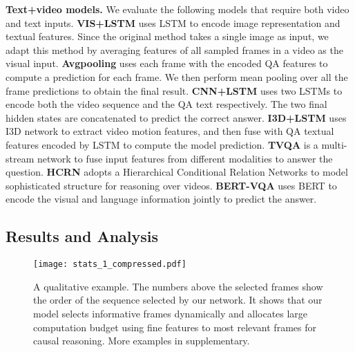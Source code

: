\documentclass[final]{cvpr}
\begin{document}
{\bf Text+video models.} We evaluate the following models that require both video and text inputs. 
{\bf VIS+LSTM} \cite{ren2015exploring} uses LSTM to encode image representation and textual features. Since the original method takes a single image as input, we adapt this method by averaging features of all sampled frames in a video as the visual input. 
{\bf Avgpooling} uses each frame with the encoded QA features to compute a prediction for each frame.
We then perform mean pooling over all the frame predictions to obtain the final result. 
{\bf CNN+LSTM} uses two LSTMs to encode both the video sequence and the QA text respectively. The two final hidden states are concatenated to predict the correct answer.
{\bf I3D+LSTM} uses I3D network \cite{carreira2017quo} to extract video motion features, and then fuse with QA textual features encoded by LSTM to compute the model prediction.
{\bf TVQA} \cite{lei2018tvqa} is a multi-stream network to fuse input features from different modalities to answer the question. 
{\bf HCRN} \cite{Le_2020_CVPR} adopts a Hierarchical Conditional Relation Networks to model sophisticated structure for reasoning over videos.
{\bf BERT-VQA} \cite{Yang_2020_WACV} uses BERT \cite{devlin2018bert} 
to encode the visual and language information jointly to predict the answer. 
{\bf }




\subsection{Results and Analysis}

\begin{figure*}[t]
\setlength\abovecaptionskip{-5cm}
\setlength\belowcaptionskip{-5cm}
\begin{center}
    \texttt{[image: stats\_1\_compressed.pdf]}
\end{center}
\vspace{-0.3cm}
    \caption{A qualitative example. The numbers above the selected frames show the order of the sequence selected by our network. It shows that our model selects informative frames dynamically and allocates large computation budget using fine features to most relevant frames for causal reasoning. More examples in supplementary.}
\label{fig:policy_example}
\vspace{-0.3cm}
\end{figure*}
\end{document}
